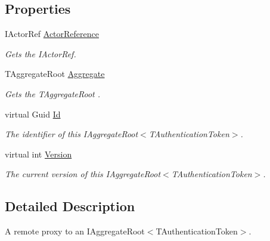 \subsection*{Properties}
\begin{DoxyCompactItemize}
\item 
I\+Actor\+Ref \hyperlink{classCqrs_1_1Akka_1_1Domain_1_1AkkaAggregateRootProxy_ad85e7a51c716484df8e5e8ea9ff31351_ad85e7a51c716484df8e5e8ea9ff31351}{Actor\+Reference}
\begin{DoxyCompactList}\small\item\em Gets the I\+Actor\+Ref. \end{DoxyCompactList}\item 
T\+Aggregate\+Root \hyperlink{classCqrs_1_1Akka_1_1Domain_1_1AkkaAggregateRootProxy_a45e41e24822f4a9a8077e10c153de163_a45e41e24822f4a9a8077e10c153de163}{Aggregate}
\begin{DoxyCompactList}\small\item\em Gets the {\itshape T\+Aggregate\+Root} . \end{DoxyCompactList}\item 
virtual Guid \hyperlink{classCqrs_1_1Akka_1_1Domain_1_1AkkaAggregateRootProxy_a7854104312b6088a2c604b334433b633_a7854104312b6088a2c604b334433b633}{Id}
\begin{DoxyCompactList}\small\item\em The identifier of this I\+Aggregate\+Root$<$\+T\+Authentication\+Token$>$. \end{DoxyCompactList}\item 
virtual int \hyperlink{classCqrs_1_1Akka_1_1Domain_1_1AkkaAggregateRootProxy_a24ff2ddef0d416ac5b936c1887ac2154_a24ff2ddef0d416ac5b936c1887ac2154}{Version}
\begin{DoxyCompactList}\small\item\em The current version of this I\+Aggregate\+Root$<$\+T\+Authentication\+Token$>$. \end{DoxyCompactList}\end{DoxyCompactItemize}


\subsection{Detailed Description}
A remote proxy to an I\+Aggregate\+Root$<$\+T\+Authentication\+Token$>$. 


